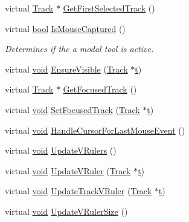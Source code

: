 \begin{DoxyCompactItemize}
\item 
virtual \hyperlink{class_track}{Track} $\ast$ \hyperlink{class_track_panel_adc2817da3a0644eec93273236b8bf246}{Get\+First\+Selected\+Track} ()
\item 
virtual \hyperlink{mac_2config_2i386_2lib-src_2libsoxr_2soxr-config_8h_abb452686968e48b67397da5f97445f5b}{bool} \hyperlink{class_track_panel_a203a9ed7a4dfdc58ee55285085ac8f2d}{Is\+Mouse\+Captured} ()
\begin{DoxyCompactList}\small\item\em Determines if the a modal tool is active. \end{DoxyCompactList}\item 
virtual \hyperlink{sound_8c_ae35f5844602719cf66324f4de2a658b3}{void} \hyperlink{class_track_panel_ac3beac44a6626a99027325104bc1076b}{Ensure\+Visible} (\hyperlink{class_track}{Track} $\ast$\hyperlink{octave__test_8m_aaccc9105df5383111407fd5b41255e23}{t})
\item 
virtual \hyperlink{class_track}{Track} $\ast$ \hyperlink{class_track_panel_ad153a631eb1fe568d57876ca637acd5a}{Get\+Focused\+Track} ()
\item 
virtual \hyperlink{sound_8c_ae35f5844602719cf66324f4de2a658b3}{void} \hyperlink{class_track_panel_a7e86eba104624072dbfa257359bdf35e}{Set\+Focused\+Track} (\hyperlink{class_track}{Track} $\ast$\hyperlink{octave__test_8m_aaccc9105df5383111407fd5b41255e23}{t})
\item 
virtual \hyperlink{sound_8c_ae35f5844602719cf66324f4de2a658b3}{void} \hyperlink{class_track_panel_a0c0e6d1eaac710cb875181e10ce867b0}{Handle\+Cursor\+For\+Last\+Mouse\+Event} ()
\item 
virtual \hyperlink{sound_8c_ae35f5844602719cf66324f4de2a658b3}{void} \hyperlink{class_track_panel_ac2d7a00f2dc191f5b6f3e2804b05aaa5}{Update\+V\+Rulers} ()
\item 
virtual \hyperlink{sound_8c_ae35f5844602719cf66324f4de2a658b3}{void} \hyperlink{class_track_panel_a057682026ce9ed46850fe36cf0f94fe4}{Update\+V\+Ruler} (\hyperlink{class_track}{Track} $\ast$\hyperlink{octave__test_8m_aaccc9105df5383111407fd5b41255e23}{t})
\item 
virtual \hyperlink{sound_8c_ae35f5844602719cf66324f4de2a658b3}{void} \hyperlink{class_track_panel_a600101a2c373bb006b53735beaa5ae1c}{Update\+Track\+V\+Ruler} (\hyperlink{class_track}{Track} $\ast$\hyperlink{octave__test_8m_aaccc9105df5383111407fd5b41255e23}{t})
\item 
virtual \hyperlink{sound_8c_ae35f5844602719cf66324f4de2a658b3}{void} \hyperlink{class_track_panel_a96d6618bcd38bbee6cb35be9d9c738ef}{Update\+V\+Ruler\+Size} ()

\end{DoxyCompactItemize}

